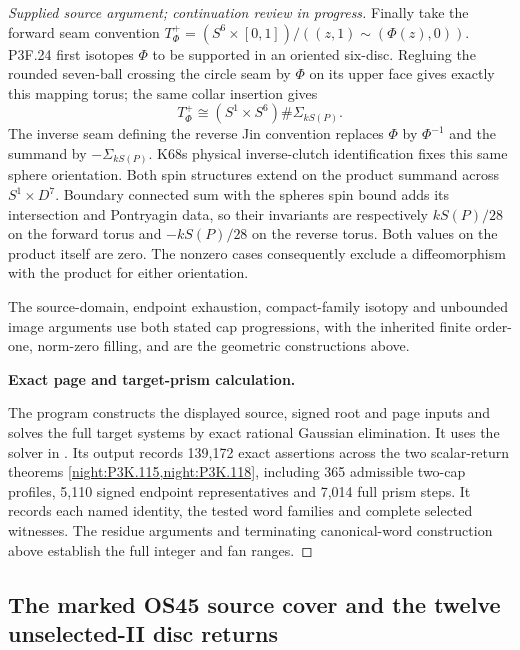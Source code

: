 \begin{proof}[Supplied source argument; continuation review in progress]
Finally take the forward seam convention
\(T^+_\Phi=(S^6\times[0,1])/((z,1)\sim(\Phi(z),0))\).
P3F.24 first isotopes \(\Phi\) to be supported in an oriented
six-disc. Regluing the rounded seven-ball crossing the circle seam
by \(\Phi\) on its upper face gives exactly this mapping torus;
the same collar insertion gives
\[
                 T^+_\Phi\cong
                    (S^1\times S^6)\#\Sigma_{kS(P)}.
 \tag{ESP.37}
\]
The inverse seam defining the reverse Jin convention replaces
\(\Phi\) by \(\Phi^{-1}\) and the summand by
\(-\Sigma_{kS(P)}\). K68\textquotesingle s physical inverse-clutch identification
fixes this same sphere orientation. Both spin structures extend
on the product summand across \(S^1\times D^7\). Boundary connected
sum with the sphere\textquotesingle s spin bound adds its intersection and
Pontryagin data, so their invariants are respectively
\(kS(P)/28\) on the forward torus and \(-kS(P)/28\) on the
reverse torus. Both values on the product itself are zero.
The nonzero cases consequently exclude a diffeomorphism with
the product for either orientation.

The source-domain, endpoint exhaustion, compact-family isotopy
and unbounded image arguments use both stated cap progressions, with
the inherited finite order-one, norm-zero filling, and are the
geometric constructions above.


\par\medskip\noindent\textbf{Exact page and target-prism calculation.}\par
The program  constructs the displayed source, signed
root and page inputs and solves the full target systems by exact
rational Gaussian elimination. It uses the solver in .
Its output  records 139,172 exact assertions across
the two scalar-return theorems \cref{night:P3K.115,night:P3K.118},
including 365 admissible two-cap profiles, 5,110 signed endpoint
representatives and 7,014 full prism steps. It records each named identity,
the tested word families and complete selected witnesses. The residue
arguments and terminating canonical-word construction above establish
the full integer and fan ranges.
\end{proof}


\subsection{The marked OS45 source cover and the twelve unselected-II disc returns}
